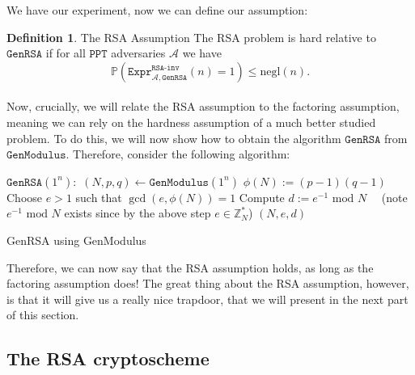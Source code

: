 \documentclass{article}
\theoremstyle{definition}
\newtheorem{definition}{Definition}[section]
\theoremstyle{example}
\newcommand{\A}{\mathcal{A}}
\newcommand{\Prob}{\mathbb{P}}
\newcommand{\Int}{\mathbb{Z}}
\newcommand{\PPT}{\texttt{PPT}}
\newcommand{\negl}{\text{negl}}
\renewcommand{\mod}{\,\,\text{mod}\,\,}
\newcommand{\Expr}[2]{\texttt{Expr}^{\texttt{#1}}_{#2}}
\newcommand{\GenModulus}{\texttt{GenModulus}}
\newcommand{\GenRSA}{\texttt{GenRSA}}
\begin{document}
  We have our experiment, now we can define our assumption:
  \begin{definition}{The RSA Assumption}
    \label{def:rsa_assumption}
  The RSA problem is hard relative to $\GenRSA$ if for all $\PPT$ adversaries $\A$
  we have
  \[
    \Prob(\Expr{RSA-inv}{\A, \GenRSA}(n) = 1) \leq \negl(n).
  \]
\end{definition}
\paragraph{} Now, crucially, we will relate the RSA assumption to the factoring
assumption, meaning we can rely on the hardness assumption of a much better
studied problem. To do this, we will now show how to obtain the algorithm
$\GenRSA$ from $\GenModulus$. Therefore, consider the following algorithm:
\begin{algorithm}
  \begin{algorithmic}
    \State $\GenRSA(1^n):$
    \State $(N, p, q) \leftarrow \GenModulus(1^n)$
    \State $\phi(N) := (p - 1)(q - 1)$
    \State Choose $e > 1$ such that $\gcd(e, \phi(N)) = 1$
    \State Compute $d := e^{-1} \mod N \quad$ (note $e^{-1} \mod N$ exists since
    by the above step $e \in \Int^*_N$) 
    \State \Return $(N, e, d)$
    \State
  \end{algorithmic}
  \caption{GenRSA using GenModulus}
  \label{alg:genrsa}
\end{algorithm}
Therefore, we can now say that the RSA assumption holds, as long as the
factoring assumption does! The great thing about the RSA assumption, however, is
that it will give us a really nice trapdoor, that we will present in the next
part of this section.
\subsection{The RSA cryptoscheme}
\end{document}
